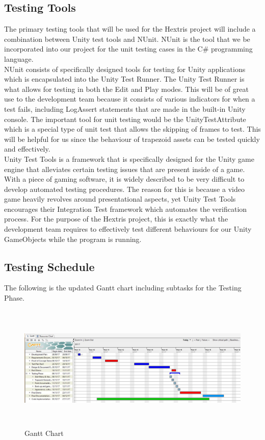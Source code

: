 \documentclass[12pt, titlepage]{article}
\begin{document}
\subsection{Testing Tools}
The primary testing tools that will be used for the Hextris project will include a combination between Unity test tools and NUnit. NUnit is the tool that we be incorporated into our project for the unit testing cases in the C\# programming language.\\

NUnit consists of specifically designed tools for testing for Unity applications which is encapsulated into the Unity Test Runner. The Unity Test Runner is what allows for testing in both the Edit and Play modes. This will be of great use to the development team because it consists of various indicators for when a test fails, including LogAssert statements that are made in the built-in Unity console. The important tool for unit testing would be the UnityTestAttribute which is a special type of unit test that allows the skipping of frames to test. This will be helpful for us since the behaviour of trapezoid assets can be tested quickly and effectively. \\

Unity Test Tools is a framework that is specifically designed for the Unity game engine that alleviates certain testing issues that are present inside of a game. With a piece of gaming software, it is widely described to be very difficult to develop automated testing procedures. The reason for this is because a video game heavily revolves around presentational aspects, yet Unity Test Tools encourages their Integration Test framework which automates the verification process. For the purpose of the Hextris project, this is exactly what the development team requires to effectively test different behaviours for our Unity GameObjects while the program is running. 

\subsection{Testing Schedule}
\noindent The following is the updated Gantt chart including subtasks for the Testing Phase.
\begin{figure}[h!]
\centering
\includegraphics[width = 14cm, height = 6cm]{GanttChart}
\caption{Gantt Chart}
\end{figure}
\end{document}
